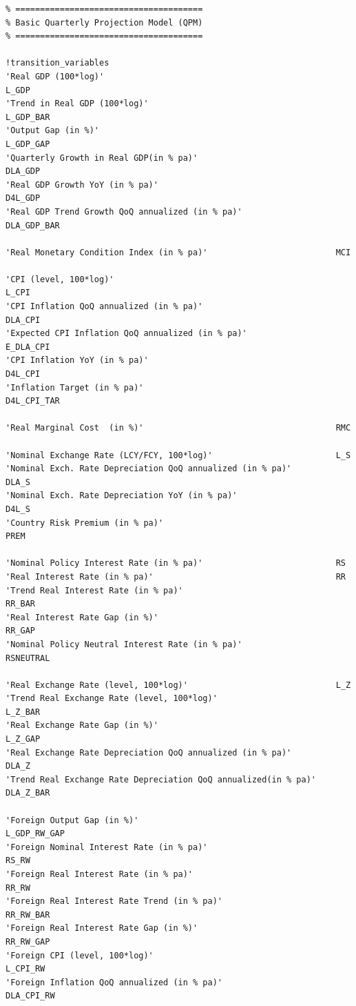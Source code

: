 \documentclass[
]{book}
\begin{document}
\begin{verbatim}
% ======================================
% Basic Quarterly Projection Model (QPM)
% ======================================

!transition_variables
'Real GDP (100*log)'                                               L_GDP
'Trend in Real GDP (100*log)'                                      L_GDP_BAR
'Output Gap (in %)'                                                L_GDP_GAP
'Quarterly Growth in Real GDP(in % pa)'                            DLA_GDP
'Real GDP Growth YoY (in % pa)'                                    D4L_GDP
'Real GDP Trend Growth QoQ annualized (in % pa)'                   DLA_GDP_BAR

'Real Monetary Condition Index (in % pa)'                          MCI

'CPI (level, 100*log)'                                             L_CPI
'CPI Inflation QoQ annualized (in % pa)'                           DLA_CPI
'Expected CPI Inflation QoQ annualized (in % pa)'                  E_DLA_CPI
'CPI Inflation YoY (in % pa)'                                      D4L_CPI
'Inflation Target (in % pa)'                                       D4L_CPI_TAR

'Real Marginal Cost  (in %)'                                       RMC

'Nominal Exchange Rate (LCY/FCY, 100*log)'                         L_S
'Nominal Exch. Rate Depreciation QoQ annualized (in % pa)'         DLA_S
'Nominal Exch. Rate Depreciation YoY (in % pa)'                    D4L_S
'Country Risk Premium (in % pa)'                                   PREM

'Nominal Policy Interest Rate (in % pa)'                           RS
'Real Interest Rate (in % pa)'                                     RR
'Trend Real Interest Rate (in % pa)'                               RR_BAR
'Real Interest Rate Gap (in %)'                                    RR_GAP
'Nominal Policy Neutral Interest Rate (in % pa)'                   RSNEUTRAL

'Real Exchange Rate (level, 100*log)'                              L_Z
'Trend Real Exchange Rate (level, 100*log)'                        L_Z_BAR
'Real Exchange Rate Gap (in %)'                                    L_Z_GAP
'Real Exchange Rate Depreciation QoQ annualized (in % pa)'         DLA_Z
'Trend Real Exchange Rate Depreciation QoQ annualized(in % pa)'    DLA_Z_BAR

'Foreign Output Gap (in %)'                                        L_GDP_RW_GAP
'Foreign Nominal Interest Rate (in % pa)'                          RS_RW
'Foreign Real Interest Rate (in % pa)'                             RR_RW 
'Foreign Real Interest Rate Trend (in % pa)'                       RR_RW_BAR
'Foreign Real Interest Rate Gap (in %)'                            RR_RW_GAP
'Foreign CPI (level, 100*log)'                                     L_CPI_RW
'Foreign Inflation QoQ annualized (in % pa)'                       DLA_CPI_RW


\end{verbatim}
\end{document}
